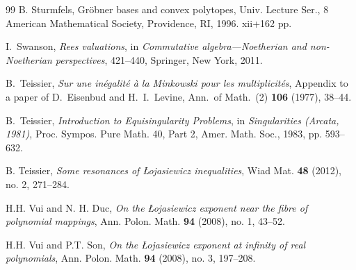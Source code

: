 \documentclass[12pt]{amsart}
\theoremstyle{plain}
\theoremstyle{definition}
\numberwithin{equation}{section}
\begin{document}
\begin{thebibliography}{99}
	B. Sturmfels,
	Gröbner bases and convex polytopes,
	Univ. Lecture Ser., 8
	American Mathematical Society, Providence, RI, 1996. xii+162 pp.
	
	
	I.~Swanson,
	\emph{Rees valuations},
	in \emph{Commutative algebra—Noetherian and non-Noetherian perspectives}, 421--440,
	Springer, New York, 2011.
	

	B.~Teissier,
	\emph{Sur une in\'egalit\'e \`a la Minkowski pour les multiplicit\'es},
	Appendix to a paper of D.~Eisenbud and H.~I.~Levine,
	Ann.\ of Math.\ (2) \textbf{106} (1977), 38--44.
	
	B.~Teissier,
	\emph{Introduction to Equisingularity Problems},
	in \emph{Singularities (Arcata, 1981)}, 
	Proc. Sympos. Pure Math. 40, Part 2,
	Amer. Math. Soc., 1983, pp. 593–632.
	
	B. Teissier,
	\emph{Some resonances of \L{}ojasiewicz inequalities},
	Wiad Mat. \textbf{48} (2012), no. 2, 271--284.

	H.H. Vui and N. H. Duc,
	\emph{On the \L{}ojasiewicz exponent near the fibre of polynomial mappings},
	Ann. Polon. Math. \textbf{94} (2008), no. 1, 43--52.
	
	H.H. Vui and P.T. Son,
	\emph{On the \L{}ojasiewicz exponent at infinity of real polynomials},
	Ann. Polon. Math. \textbf{94} (2008), no. 3, 197--208.

\end{thebibliography}
\end{document}
